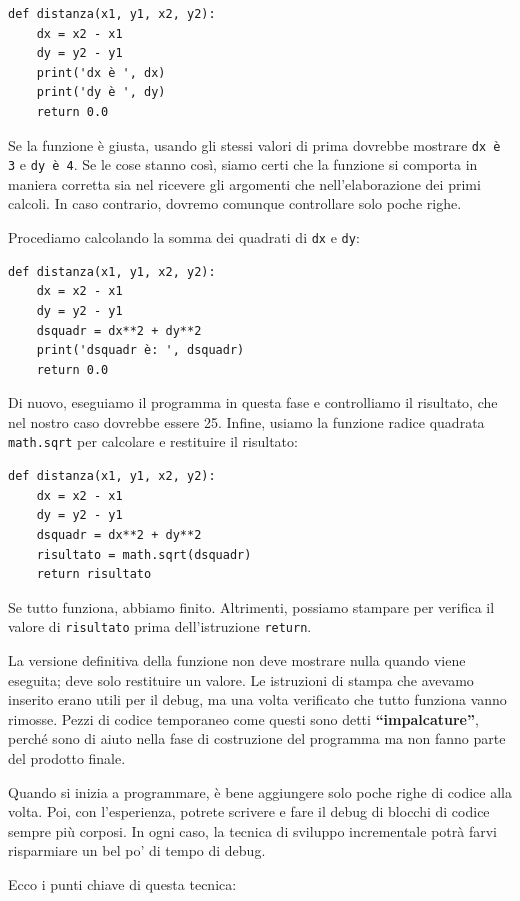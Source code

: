 \documentclass[10pt]{book}
\begin{document}
\begin{verbatim}
def distanza(x1, y1, x2, y2):
    dx = x2 - x1
    dy = y2 - y1
    print('dx è ', dx)
    print('dy è ', dy)
    return 0.0
\end{verbatim}
%
Se la funzione è giusta, usando gli stessi valori di prima dovrebbe mostrare \verb"dx è 3" e \verb"dy è 4". Se le cose stanno così, siamo certi che la funzione si comporta in maniera corretta sia nel ricevere gli argomenti che nell'elaborazione dei primi calcoli. In caso contrario, dovremo comunque controllare solo poche righe.

Procediamo calcolando la somma dei quadrati di {\tt dx} e {\tt dy}:

\begin{verbatim}
def distanza(x1, y1, x2, y2):
    dx = x2 - x1
    dy = y2 - y1
    dsquadr = dx**2 + dy**2
    print('dsquadr è: ', dsquadr)
    return 0.0
\end{verbatim}
%
Di nuovo, eseguiamo il programma in questa fase e controlliamo il risultato, che nel nostro caso dovrebbe essere 25.
Infine, usiamo la funzione radice quadrata {\tt math.sqrt} per calcolare e restituire il risultato:

\begin{verbatim}
def distanza(x1, y1, x2, y2):
    dx = x2 - x1
    dy = y2 - y1
    dsquadr = dx**2 + dy**2
    risultato = math.sqrt(dsquadr)
    return risultato
\end{verbatim}
%
Se tutto funziona, abbiamo finito. Altrimenti, possiamo stampare per verifica il valore di {\tt risultato} prima dell'istruzione {\tt return}.

La versione definitiva della funzione non deve mostrare nulla quando viene eseguita; deve  solo restituire un valore. Le istruzioni di stampa che avevamo inserito erano utili per il debug, ma una volta verificato che tutto funziona vanno rimosse. Pezzi di codice temporaneo come questi sono detti {\bf ``impalcature''}, perché sono di aiuto nella fase di costruzione del programma ma non fanno parte del prodotto finale. 

Quando si inizia a programmare, è bene aggiungere solo poche righe di codice alla volta. Poi, con l'esperienza, potrete scrivere e fare il debug di blocchi di codice sempre più corposi. In ogni caso, la tecnica di sviluppo incrementale potrà farvi risparmiare un bel po' di tempo di debug.

Ecco i punti chiave di questa tecnica:
\end{document}
